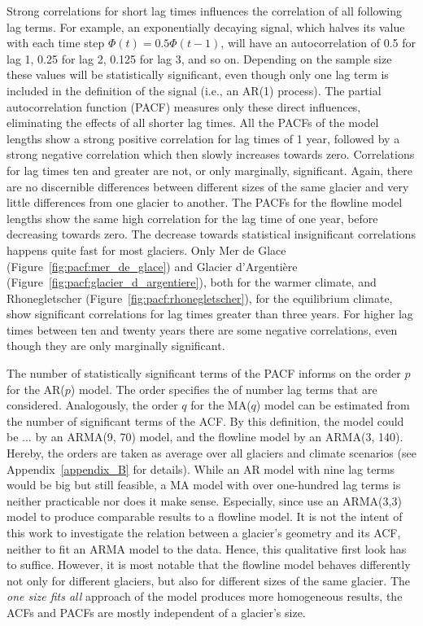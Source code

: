       Strong correlations for short lag times influences the correlation of all following lag terms. For example, an exponentially decaying signal, which halves its value with each time step $\Phi(t) = 0.5 \Phi(t-1)$, will have an autocorrelation of 0.5 for lag 1, 0.25 for lag 2, 0.125 for lag 3, and so on. Depending on the sample size these values will be statistically significant, even though only one lag term is included in the definition of the signal (i.e., an AR(1) process). The partial autocorrelation function (PACF) measures only these direct influences, eliminating the effects of all shorter lag times. All the PACFs of the \vas{} model lengths show a strong positive correlation for lag times of 1 year, followed by a strong negative correlation which then slowly increases towards zero. Correlations for lag times ten and greater are not, or only marginally, significant. Again, there are no discernible differences between different sizes of the same glacier and very little differences from one glacier to another. The PACFs for the flowline model lengths show the same high correlation for the lag time of one year, before decreasing towards zero. The decrease towards statistical insignificant correlations happens quite fast for most glaciers. Only Mer de Glace (Figure~\ref{fig:pacf:mer_de_glace}) and Glacier d'Argentière (Figure~\ref{fig:pacf:glacier_d_argentiere}), both for the warmer climate, and Rhonegletscher (Figure~\ref{fig:pacf:rhonegletscher}), for the equilibrium climate, show significant correlations for lag times greater than three years. For higher lag times between ten and twenty years there are some negative correlations, even though they are only marginally significant.

      The number of statistically significant terms of the PACF informs on the order $p$ for the AR($p$) model. The order specifies the of number lag terms that are considered. Analogously, the order $q$ for the MA($q$) model can be estimated from the number of significant terms of the ACF. By this definition, the \vas{} model could be ... by an ARMA(9, 70) model, and the flowline model by an ARMA(3, 140). Hereby, the orders are taken as average over all glaciers and climate scenarios (see Appendix~\ref{appendix_B} for details). While an AR model with nine lag terms would be big but still feasible, a MA model with over one-hundred lag terms is neither practicable nor does it make sense. Especially, since \citet{Roe2014} use an ARMA(3,3) model to produce comparable results to a flowline model. It is not the intent of this work to investigate the relation between a glacier's geometry and its ACF, neither to fit an ARMA model to the data. Hence, this qualitative first look has to suffice. However, it is most notable that the flowline model behaves differently not only for different glaciers, but also for different sizes of the same glacier. The \textit{one size fits all} approach of the \vas{} model produces more homogeneous results, the ACFs and PACFs are mostly independent of a glacier's size.

